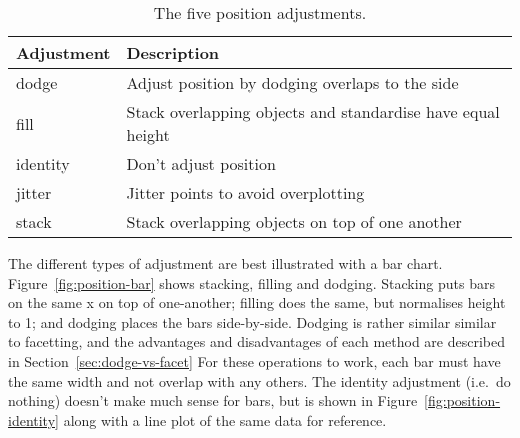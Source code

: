 \begin{table}
  \begin{center}
  \begin{tabular}{ll}
    \toprule
    Adjustment & Description  \\
    \midrule
    dodge     & Adjust position by dodging overlaps to the side \\
    fill      & Stack overlapping objects and standardise have equal height\\
    identity  & Don't adjust position \\
    jitter    & Jitter points to avoid overplotting \\
    stack     & Stack overlapping objects on top of one another \\
    \bottomrule
  \end{tabular}
  \end{center}
  \caption{The five position adjustments.}
  \label{fig:position}
\end{table}

The different types of adjustment are best illustrated with a bar chart.  Figure~\ref{fig:position-bar} shows stacking, filling and dodging.  Stacking puts bars on the same x on top of one-another; filling does the same, but normalises height to 1; and dodging places the bars side-by-side.  Dodging is rather similar similar to facetting, and the advantages and disadvantages of each method are described in Section~\ref{sec:dodge-vs-facet} For these operations to work, each bar must have the same width and not overlap with any others.  The identity adjustment (i.e.\ do nothing) doesn't make much sense for bars, but is shown in Figure~\ref{fig:position-identity} along with a line plot of the same data for reference.

% 


% 


